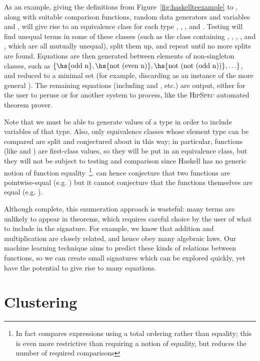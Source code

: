 As an example, giving the definitions from Figure~\ref{fig:haskellteexample} to
\qspec{}, along with suitable comparison functions, random data generators and
variables  and , will give rise to an equivalence
class for each type , , ,  and
. Testing will find unequal terms in some of these classes
(such as the  class containing , , ,
,  and , which are all mutually unequal), split
them up, and repeat until no more splits are found. Equations are then generated
between elements of non-singleton classes, such as $\{\text{\hs{odd n}},
\text{\hs{not (even n)}}, \text{\hs{not (not (odd n))}}, \ldots\}$, and reduced
to a minimal set (for example, discarding  as an
instance of the more general ). The remaining equations
(including  and , etc.) are
output, either for the user to peruse or for another system to process, like the
\textsc{HipSpec} automated theorem prover.

Note that we must be able to generate values of a type in order to include
variables of that type. Also, only equivalence classes whose element type can be
compared are split and conjectured about in this way; in particular, functions
(like  and ) are first-class values, so they will be put in an
equivalence class, but they will not be subject to testing and comparison since
Haskell has no generic notion of function equality~\footnote{In
  fact \qspec{} compares expressions using a total ordering rather than equality;
  this is even more restrictive than requiring a notion of equality, but reduces
  the number of required comparisons}. \qspec{} can hence conjecture that two
functions are pointwise-equal (e.g. ) but it cannot conjecture
that the functions themselves are equal (e.g. ).

Although complete, this enumeration approach is wasteful: many terms are
unlikely to appear in theorems, which requires careful choice by the user of
what to include in the signature. For example, we know that addition and
multiplication are closely related, and hence obey many algebraic laws. Our
machine learning technique aims to predict these kinds of relations between
functions, so we can create small signatures which can be explored quickly, yet
have the potential to give rise to many equations.

\section{Clustering}
\label{sec:clustering}

